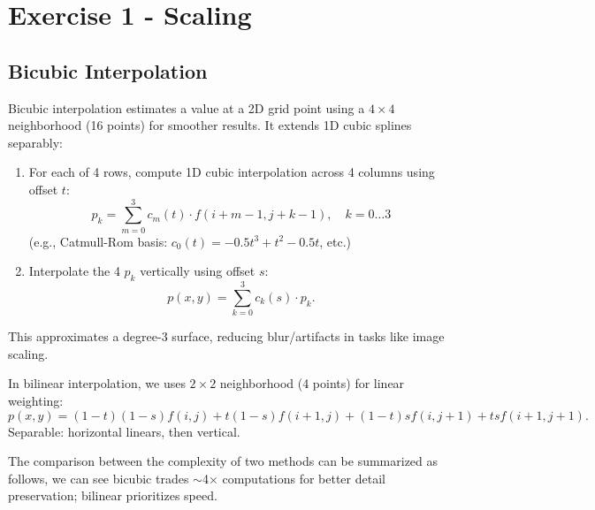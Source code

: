 \documentclass[12pt]{article}
\title{\mytitle}
\author{\textbf{\myauthor}}
\date{Due: 10/13/2025}
\begin{document}
\onehalfspacing
\maketitle

\section{Exercise 1 - Scaling}
\subsection{}
\subsection{}
\subsection{}
\subsection{Bicubic Interpolation}

Bicubic interpolation estimates a value at a 2D grid point using a $4\times4$ neighborhood (16 points) for smoother results. It extends 1D cubic splines separably: 

\begin{enumerate}
\item For each of 4 rows, compute 1D cubic interpolation across 4 columns using offset $t$:
\[
p_k = \sum_{m=0}^{3} c_m(t) \cdot f(i+m-1, j+k-1), \quad k=0\dots3
\]
(e.g., Catmull-Rom basis: $c_0(t) = -0.5t^3 + t^2 - 0.5t$, etc.)

\item Interpolate the 4 $p_k$ vertically using offset $s$:
\[
p(x,y) = \sum_{k=0}^{3} c_k(s) \cdot p_k.
\]
\end{enumerate}

This approximates a degree-3 surface, reducing blur/artifacts in tasks like image scaling.

In bilinear interpolation, we uses $2\times2$ neighborhood (4 points) for linear weighting:
\[
p(x,y) = (1-t)(1-s)f(i,j) + t(1-s)f(i+1,j) + (1-t)sf(i,j+1) + ts f(i+1,j+1).
\]
Separable: horizontal linears, then vertical.

The comparison between the complexity of two methods can be summarized as follows, we can see bicubic trades $\sim$4$\times$ computations for better detail preservation; bilinear prioritizes speed.
\end{document}
